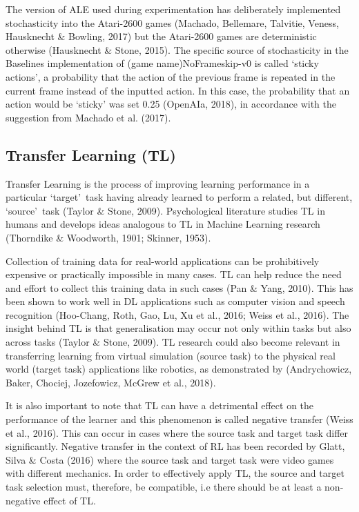 The version of ALE used during experimentation has deliberately implemented stochasticity into the Atari-2600 games (Machado, Bellemare, Talvitie, Veness, Hausknecht \& Bowling, 2017) but the Atari-2600 games are deterministic otherwise (Hausknecht \& Stone, 2015). The specific source of stochasticity in the Baselines implementation of (game name)NoFrameskip-v0 is called ‘sticky actions’, a probability that the action of the previous frame is repeated in the current frame instead of the inputted action. In this case, the probability that an action would be ‘sticky’ was set 0.25 (OpenAIa, 2018), in accordance with the suggestion from Machado et al. (2017).

\subsection*{Transfer Learning (TL)}
Transfer Learning is the process of improving learning performance in a particular \lq target\rq \ task having already learned to perform a related, but different, \lq source\rq \ task (Taylor \& Stone, 2009). Psychological literature studies TL in humans and develops ideas analogous to TL in Machine Learning research (Thorndike \& Woodworth, 1901; Skinner, 1953).

Collection of training data for real-world applications can be prohibitively expensive or practically impossible in many cases. TL can help reduce the need and effort to collect this training data in such cases (Pan \& Yang, 2010). This has been shown to work well in DL applications such as computer vision and speech recognition (Hoo-Chang, Roth, Gao, Lu, Xu et al., 2016; Weiss et al., 2016). The insight behind TL is that generalisation may occur not only within tasks but also across tasks (Taylor \& Stone, 2009). TL research could also become relevant in transferring learning from virtual simulation (source task) to the physical real world (target task) applications like robotics, as demonstrated by (Andrychowicz, Baker, Chociej, Jozefowicz, McGrew et al., 2018). 

It is also important to note that TL can have a detrimental effect on the performance of the learner and this phenomenon is called negative transfer (Weiss et al., 2016). This can occur in cases where the source task and target task differ significantly. Negative transfer in the context of RL has been recorded by Glatt, Silva \& Costa (2016) where the source task and target task were video games with different mechanics. In order to effectively apply TL, the source and target task selection must, therefore, be compatible, i.e there should be at least a non-negative effect of TL. 

